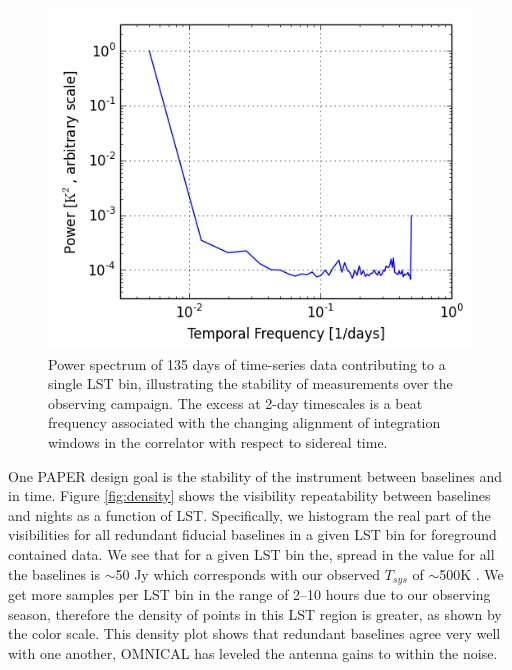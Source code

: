 \documentclass[twocolumn,numberedappendix]{emulateapj} \shorttitle{PSA64}
\begin{document}
\begin{figure}
\centering
\includegraphics[width=\columnwidth]{plots/stability.png}
\caption{Power spectrum of 135 days of time-series data contributing to a single LST bin,
illustrating the stability of measurements over the observing campaign.  The excess at
2-day timescales is a beat frequency associated with the changing alignment of 
integration windows in the correlator with respect to sidereal time.  
}\label{fig:stability}
\end{figure}


One PAPER design goal is the stability of the instrument between
baselines and in time. Figure \ref{fig:density} shows the visibility repeatability between 
baselines and nights as a function of LST. Specifically, we histogram the real part of
the visibilities for all redundant fiducial baselines 
in a given LST bin for foreground contained data. We see that for a
given LST bin the, spread in the value for all the baselines is $\sim$50 Jy which corresponds with our observed
$T_{sys}$ of $\sim$500K .  We get
more samples per LST bin in the range of 2--10 hours due to our observing
season, therefore the density of points in this LST region is greater, as shown by
the color scale. This density plot shows that redundant baselines agree very well
with one another, OMNICAL has leveled the antenna gains to within the noise.
\end{document}
